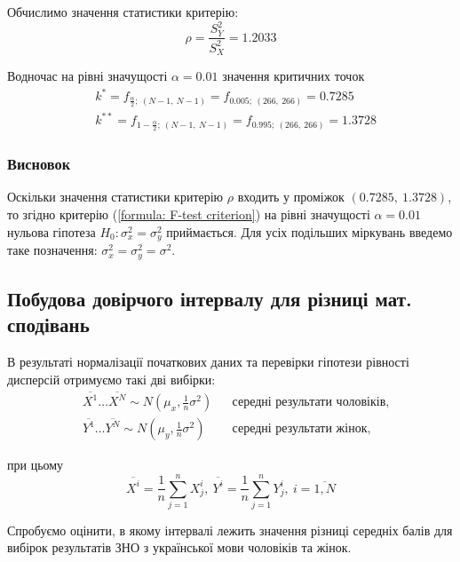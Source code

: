 Обчислимо значення статистики критерію:
\begin{equation*}
    \rho = \frac{S_Y^2}{S_X^2} = 1.2033
\end{equation*}

Водночас на рівні значущості $\alpha=0.01$ значення критичних точок
\begin{align*} 
   &k^* = f_{\frac{\alpha}{2};\ (N-1,\ N-1)} = f_{0.005;\ (266,\ 266)} = 0.7285 \\
   &k^{**} = f_{1-\frac{\alpha}{2};\ (N-1,\ N-1)} = f_{0.995;\ (266,\ 266)} = 1.3728
\end{align*}

\subsubsection{Висновок}
\label{page: UKR dispersion hypothesis}

Оскільки значення статистики критерію $\rho$ входить у проміжок $(0.7285,\ 1.3728)$, то згідно критерію 
(\ref{formula: F-test criterion}) на рівні значущості $\alpha=0.01$ нульова гіпотеза $H_0: \sigma_x^2=\sigma_y^2$ 
приймається. Для усіх подільших міркувань введемо таке позначення: $\sigma_x^2=\sigma_y^2=\sigma^2$.

\subsection*{Побудова довірчого інтервалу для різниці мат. сподівань}

В результаті нормалізації початкових даних та перевірки гіпотези рівності дисперсій отримуємо такі дві вибірки: 
\begin{align}
    &\overline{X^1}\ldots \overline{X^N}\sim N(\mu_x,\tfrac{1}{n}\sigma^2) && \text{середні результати чоловіків,} \label{formula: UKR ND X} \\
    &\overline{Y^1}\ldots \overline{Y^N}\sim N(\mu_y,\tfrac{1}{n}\sigma^2) && \text{середні результати жінок,} \label{formula: UKR ND Y}
\end{align}

при цьому
\[ \overline{X^i}=\frac{1}{n}\sum\limits_{j=1}^nX^i_j,\ 
   \overline{Y^i}=\frac{1}{n}\sum\limits_{j=1}^nY^i_j,\ i=\overline{1,N} \]

Спробуємо оцінити, в якому інтервалі лежить значення різниці середніх балів для вибірок результатів ЗНО з 
української мови чоловіків та жінок.

